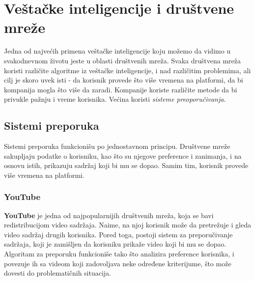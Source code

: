\documentclass[a4paper]{article}
\newtheorem{primer}{Primer}[section]
\begin{document}

\section{Veštačke inteligencije i društvene mreže}
\label{sec:preporučivanje}

Jedna od najvećih primena veštačke inteligencije koju možemo da vidimo u svakodnevnom životu jeste u oblasti društvenih mreža. Svaka društvena mreža koristi različite algoritme iz veštačke inteligencije, i nad različitim problemima,
ali cilj je skoro uvek isti - da korisnik provede što više vremena na platformi, da bi kompanija mogla što više da zaradi.
Kompanije koriste različite metode da bi privukle pažnju i vreme korisnika. Većina koristi \emph{sisteme preoporučivanja}.
\subsection{Sistemi preporuka}
Sistemi preporuka funkcionišu po jednostavnom principu. Društvene mreže sakupljaju podatke o korisniku, kao što su njegove preference i zanimanja, i na osnovu istih, prikazuju sadržaj koji bi mu se dopao. Samim tim, korisnik provede više vremena na platformi.
\subsubsection{YouTube}
\textbf{YouTube} je jedna od najpopularnijih društvenih mreža, koja se bavi redistribucijom video sadržaja. Naime, na njoj korisnik može da pretrežuje i gleda video sadržaj drugih korisnika. Pored toga, postoji sistem za preporučivanje sadržaja, koji je zamišljen da korisniku prikaže video koji bi mu se dopao. Algoritam za preporuku funkcioniše tako što analizira preference korisnika, i povezuje ih sa videom koji zadovoljava neke određene kriterijume, što može dovesti do problematičnih situacija.
\end{document}
